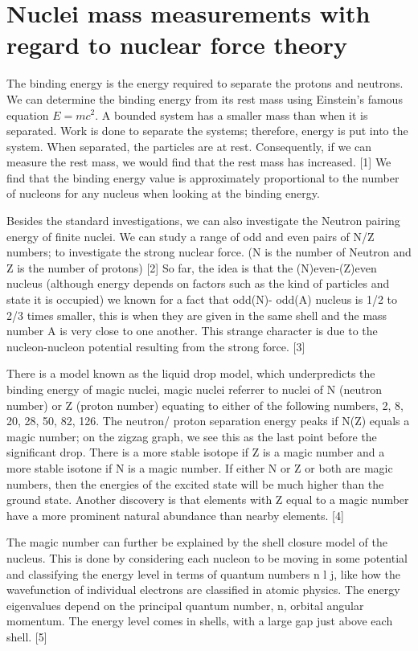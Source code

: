 \section{Nuclei mass measurements with regard to nuclear force theory}
The binding energy is the energy required to separate the protons and neutrons.
We can determine the binding energy from its rest mass using Einstein’s famous equation $E=mc^2$.
A bounded system has a smaller mass than when it is separated.
Work is done to separate the systems; therefore, energy is put into the system.
When separated, the particles are at rest.
Consequently, if we can measure the rest mass, we would find that the rest mass has increased. [1]
We find that the binding energy value is approximately proportional to the number of nucleons for any nucleus when looking at the binding energy.

Besides the standard investigations, we can also investigate the Neutron pairing energy of finite nuclei.
We can study a range of odd and even pairs of N/Z numbers; to investigate the strong nuclear force.
(N is the number of Neutron and Z is the number of protons) [2] So far, the idea is that the (N)even-(Z)even nucleus (although energy depends on factors such as the kind of particles and state it is occupied) we known for a fact that odd(N)- odd(A) nucleus is 1/2 to 2/3 times smaller, this is when they are given in the same shell and the mass number A is very close to one another.
This strange character is due to the nucleon-nucleon potential resulting from the strong force. [3]

There is a model known as the liquid drop model, which underpredicts the binding energy of magic nuclei, magic nuclei referrer to nuclei of N (neutron number) or Z (proton number) equating to either of the following numbers, 2, 8, 20, 28, 50, 82, 126.
The neutron/ proton separation energy peaks if N(Z) equals a magic number; on the zigzag graph, we see this as the last point before the significant drop.
There is a more stable isotope if Z is a magic number and a more stable isotone if N is a magic number.
If either N or Z or both are magic numbers, then the energies of the excited state will be much higher than the ground state.
Another discovery is that elements with Z equal to a magic number have a more prominent natural abundance than nearby elements. [4]

The magic number can further be explained by the shell closure model of the nucleus.
This is done by considering each nucleon to be moving in some potential and classifying the energy level in terms of quantum numbers n l j, like how the wavefunction of individual electrons are classified in atomic physics.
The energy eigenvalues depend on the principal quantum number, n, orbital angular momentum.
The energy level comes in shells, with a large gap just above each shell. [5]

